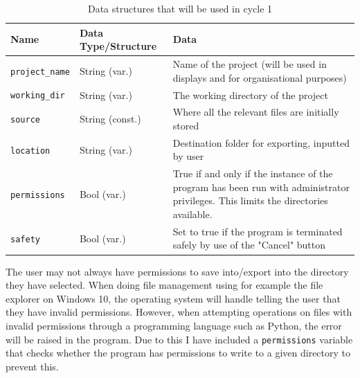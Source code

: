 \documentclass[11pt]{article}
\newcommand{\ra}[1]{\renewcommand{\arraystretch}{#1}}
\begin{document}
                \begin{table}[!ht]
                    \centering
                    \begin{tabular}{llm{}}
                        Name & Data Type/Structure & Data \\ \hline
                        \verb|project_name| & String (var.) & Name of the project (will be used in displays and for organisational purposes) \\
                        \verb|working_dir| & String (var.) & The working directory of the project \\
                        \verb|source| & String (const.) & Where all the relevant files are initially stored \\
                        \verb|location| & String (var.) & Destination folder for exporting, inputted by user \\
                        \verb|permissions| & Bool (var.) & True if and only if the instance of the program has been run with administrator privileges. This limits the directories available. \\
                        \verb|safety| & Bool (var.) & Set to true if the program is terminated safely by use of the "Cancel" button
                    \end{tabular}
                    \caption{Data structures that will be used in cycle 1}
                    \label{tbl:data_structs_c1}
                \end{table}


                The user may not always have permissions to save into/export into the directory they have selected. When doing file management using for example the file explorer on Windows 10, the operating system will handle telling the user that they have invalid permissions. However, when attempting operations on files with invalid permissions through a programming language such as Python, the error will be raised in the program. Due to this I have included a \verb|permissions| variable that checks whether the program has permissions to write to a given directory to prevent this.
\end{document}
